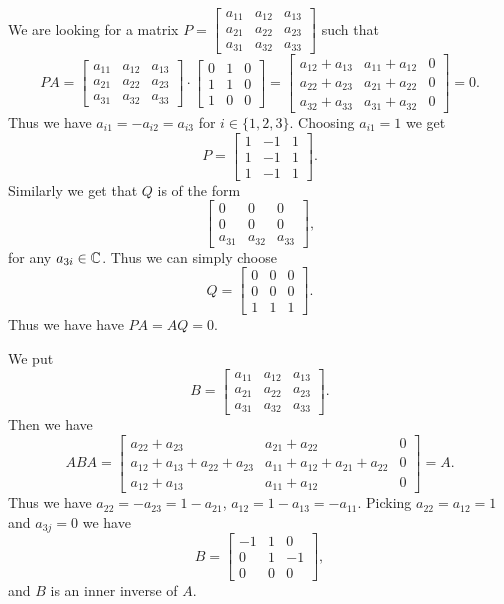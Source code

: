 \documentclass{article}
\begin{document}
\begin{solution}
  We are looking for a matrix $P = \begin{bmatrix} a_{11} & a_{12} & a_{13}\\ a_{21} & a_{22} & a_{23}\\ a_{31} & a_{32} & a_{33} \end{bmatrix}$ such that
  \[PA = \begin{bmatrix} a_{11} & a_{12} & a_{13}\\ a_{21} & a_{22} & a_{23}\\ a_{31} & a_{32} & a_{33} \end{bmatrix} \cdot \begin{bmatrix} 0 & 1 & 0\\ 1 & 1 & 0\\ 1 & 0 & 0 \end{bmatrix} = \begin{bmatrix} a_{12} + a_{13} & a_{11} + a_{12} & 0\\ a_{22} + a_{23} & a_{21} + a_{22} & 0\\ a_{32} + a_{33} & a_{31} + a_{32} & 0 \end{bmatrix} = 0.\]
  Thus we have $a_{i1} = - a_{i2} = a_{i3}$ for $i \in \{1, 2, 3\}$.
  Choosing $a_{i1} = 1$ we get
  \[P = \begin{bmatrix} 1 & -1 & 1\\ 1 & -1 & 1\\ 1 & -1 & 1 \end{bmatrix}.\]
  Similarly we get that $Q$ is of the form
  \[\begin{bmatrix} 0 & 0 & 0\\ 0 & 0 & 0\\ a_{31} & a_{32} & a_{33} \end{bmatrix},\]
  for any $a_{3i} \in \mathbb{C}$.
  Thus we can simply choose
  \[Q = \begin{bmatrix} 0 & 0 & 0\\ 0 & 0 & 0\\ 1 & 1 & 1 \end{bmatrix}.\]
  Thus we have have $PA = AQ = 0$.

  We put
  \[B = \begin{bmatrix} a_{11} & a_{12} & a_{13}\\ a_{21} & a_{22} & a_{23}\\ a_{31} & a_{32} & a_{33} \end{bmatrix}.\]
  Then we have
  \[ABA = \begin{bmatrix} a_{22} + a_{23} & a_{21} + a_{22} & 0\\ a_{12} + a_{13} + a_{22} + a_{23} & a_{11} + a_{12} + a_{21} + a_{22} & 0\\ a_{12} + a_{13} & a_{11} + a_{12} & 0 \end{bmatrix} = A.\]
  Thus we have $a_{22} = - a_{23} = 1 - a_{21}$, $a_{12} = 1 - a_{13} = - a_{11}$.
  Picking $a_{22} = a_{12} = 1$ and $a_{3j} = 0$ we have
  \[B = \begin{bmatrix} -1 & 1 & 0\\ 0 & 1 & -1\\ 0 & 0 & 0 \end{bmatrix},\]
  and $B$ is an inner inverse of $A$.


\end{solution}
\end{document}
